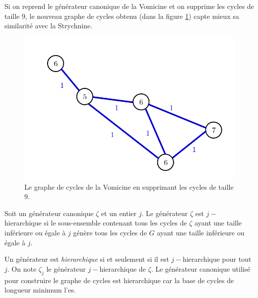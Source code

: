 \begin{exemple}
Si on reprend le générateur canonique de la Vomicine et on supprime les cycles de taille $9$, le nouveau graphe de cycles obtenu (dans la figure \ref{newjhierarchique}) capte mieux sa similarité avec la Strychnine.

\begin{figure}[H]
\label{newjhierarchique}
\begin{center}
\includegraphics[scale=0.5]{gc_vomicine.png}
\end{center}
\caption{Le graphe de cycles de la Vomicine en supprimant les cycles de taille $9$.}
\end{figure}

\end{exemple}


\begin{definition}
Soit un générateur canonique $\zeta$ et un entier $j$. Le générateur $\zeta$ est $j-$hierarchique si le sous-ensemble contenant tous les cycles de $\zeta$ ayant une taille inférieure ou égale à $j$ génère tous les cycles de $G$ ayant une taille inférieure ou égale à $j$.
\end{definition}

Un générateur est \textit{hierarchique} si et seulement si il est $j-$hierarchique pour tout $j$. On note $\zeta_j$ le générateur $j-$hierarchique de $\zeta$. Le générateur canonique utilisé pour construire le graphe de cycles est hierarchique car la base de cycles de longueur minimum l'es.


